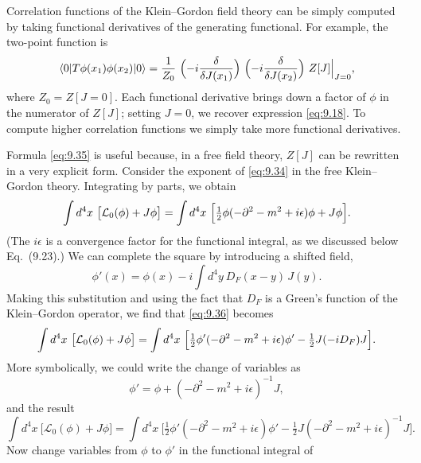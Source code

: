 Correlation functions of the Klein--Gordon field theory can be simply
computed by taking functional derivatives of the generating functional.  For
example, the two-point function is
\begin{equation}
  \langle 0|T\phi(x_1)\phi(x_2)|0\rangle
  = \frac{1}{Z_0}\ \Bigl( -i\frac{\delta}{\delta J(x_1)} \Bigr)\
    \Bigl( -i\frac{\delta}{\delta J(x_2)} \Bigr)\ Z[J]\Big|_{J=0},
  \label{eq:9.35}
\end{equation}
where $Z_0 = Z[J=0]$.  Each functional derivative brings down a factor of
$\phi$ in the numerator of $Z[J]$; setting $J=0$, we recover expression
\eqref{eq:9.18}.  To compute higher correlation functions we simply take more
functional derivatives.

Formula \eqref{eq:9.35} is useful because, in a free field theory, $Z[J]$ can
be rewritten in a very explicit form.  Consider the exponent of \eqref{eq:9.34}
in the free Klein--Gordon theory.  Integrating by parts, we obtain
\begin{equation}
  \int d^4x\ \bigl[ \mathcal{L}_0(\phi) + J\phi \bigr]
  = \int d^4x\ \Bigl[ \tfrac{1}{2}\phi(-\partial^2-m^2+i\epsilon)\phi
    + J\phi \Bigr].
  \label{eq:9.36}
\end{equation}
(The $i\epsilon$ is a convergence factor for the functional integral, as we
discussed below Eq.~(9.23).)  We can complete the square by
introducing a shifted field,
\begin{equation}
  \phi'(x) = \phi(x) - i\int d^4y\ D_F(x-y)\,J(y) .
\end{equation}
Making this substitution and using the fact that $D_F$ is a Green's function
of the Klein--Gordon operator, we find that \eqref{eq:9.36} becomes
\begin{equation}
  \int d^4x\ \bigl[ \mathcal{L}_0(\phi)+J\phi \bigr]
  = \int d^4x\ \Bigl[ \tfrac{1}{2}\phi'(-\partial^2-m^2+i\epsilon)\phi'
    - \tfrac{1}{2}J(-iD_F)J \Bigr] .
\end{equation}
More symbolically, we could write the change of variables as
\begin{equation}
  \phi' = \phi + (-\partial^2-m^2+i\epsilon)^{-1}J,
  \label{eq:9.37}
\end{equation}
and the result
\begin{equation}
  \int d^4x\ \bigl[ \mathcal{L}_0(\phi)+J\phi \bigr]
  = \int d^4x\ \bigl[ \tfrac{1}{2}\phi'(-\partial^2-m^2+i\epsilon)\phi'
    - \tfrac{1}{2}J(-\partial^2-m^2+i\epsilon)^{-1}J \bigr].
  \label{eq:9.38}
\end{equation}
Now change variables from $\phi$ to $\phi'$ in the functional integral of
